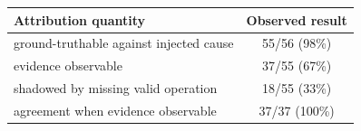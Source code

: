 \begingroup\setlength{\tabcolsep}{6pt}
\begin{tabular}{@{}l c@{}}
\hline
\textbf{Attribution quantity} & \textbf{Observed result} \\
\hline
ground-truthable against injected cause & 55/56 (98\%) \\
evidence observable & 37/55 (67\%) \\
shadowed by missing valid operation & 18/55 (33\%) \\
agreement when evidence observable & 37/37 (100\%) \\
\hline
\end{tabular}
\endgroup
